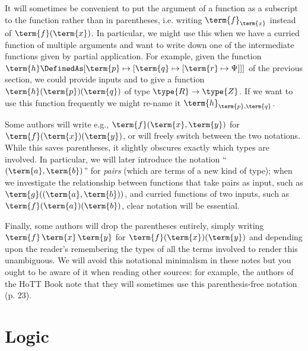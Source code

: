 It will sometimes be convenient to put the argument of a function as a subscript to the function rather than in parentheses, i.e. writing 
$\term{f}_{\term{x}}$ 
instead of
$\term{f}(\term{x})$.  In particular, we might use this when we have a curried function of multiple arguments and want to write down one of the intermediate functions given by partial application.  For example, given the function 
$
\term{h} \DefinedAs 
[\term{p} \mapsto [\term{q} \mapsto [\term{r} \mapsto \Psi]]]
$
of the previous section, we could provide inputs  and  to give a function 
$\term{h}(\term{p})(\term{q})$ of type $\type{R} \to \type{Z}$.  
If we want to use this function frequently we might re-name it 
$\term{h}_{\term{p},\term{q}}$.

Some authors will write e.g., 
$\term{f}(\term{x},\term{y})$ for
$\term{f}(\term{x})(\term{y})$, or will freely switch between the two notations.  While this saves parentheses, it slightly obscures exactly which types are involved.  In particular, we will later introduce the notation ``$(\term{a},\term{b})$'' for \emph{pairs} (which are terms of a new kind of type); when we investigate the relationship between functions that take pairs as input, such as $\term{g}((\term{a},\term{b}))$, and curried functions of two inputs, such as $\term{f}(\term{a})(\term{b})$, clear notation will be essential.

Finally, some authors will drop the parentheses entirely, simply writing $\term{f}\,\term{x}\,\term{y}$
for
$\term{f}(\term{x})(\term{y})$
and depending upon the reader's remembering the types of all the terms involved to render this unambiguous.  We will avoid this notational minimalism in these notes but you ought to be aware of it when reading other sources: for example, the authors of the HoTT Book note that they will sometimes use this parenthesis-free notation (p. 23).






\newpage









\newpage
\section{Logic}
\label{sec:Logic}

